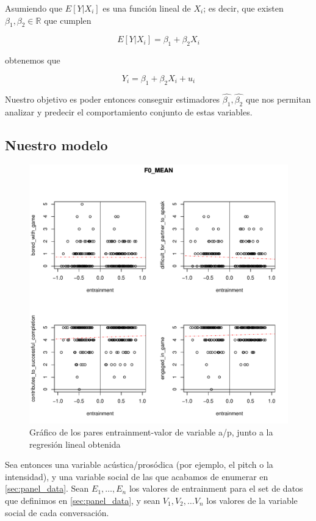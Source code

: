 Asumiendo que $E[Y|X_i]$ es una función lineal de $X_i$; es decir, que existen $\beta_1, \beta_2 \in \mathbb{R}$ que cumplen

\begin{equation}
  E[Y|X_i] = \beta_1 + \beta_2 X_i
\end{equation}

obtenemos que

\begin{equation}
  Y_i = \beta_1 + \beta_2 X_i + u_i
\end{equation}

Nuestro objetivo es poder entonces conseguir estimadores $\widehat{\beta_1}, \widehat{\beta_2}$ que nos permitan analizar y predecir el comportamiento conjunto de estas variables.

\subsection{Nuestro modelo}
\begin{figure}
\centering
\includegraphics[width=15cm]{images/regression_F0_MEAN_1.pdf}
\caption{Gráfico de los pares entrainment-valor de variable a/p, junto a la regresión lineal obtenida}
\end{figure}

Sea entonces una variable acústica/prosódica (por ejemplo, el pitch o la intensidad), y una variable social de las que acabamos de enumerar en \ref{sec:panel_data}. Sean $E_1, \ldots, E_n$ los valores de entrainment para el set de datos que definimos en \ref{sec:panel_data}, y sean $V_1, V_2, \ldots V_n$ los valores de la variable social de cada conversación.

